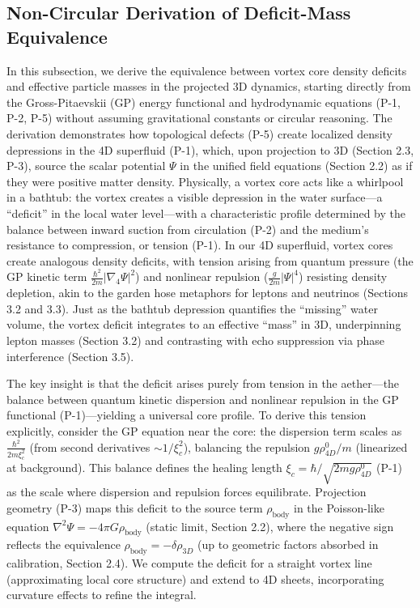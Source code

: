 \subsection{Non-Circular Derivation of Deficit-Mass Equivalence}

In this subsection, we derive the equivalence between vortex core density deficits and effective particle masses in the projected 3D dynamics, starting directly from the Gross-Pitaevskii (GP) energy functional and hydrodynamic equations (P-1, P-2, P-5) without assuming gravitational constants or circular reasoning. The derivation demonstrates how topological defects (P-5) create localized density depressions in the 4D superfluid (P-1), which, upon projection to 3D (Section 2.3, P-3), source the scalar potential $\Psi$ in the unified field equations (Section 2.2) as if they were positive matter density. Physically, a vortex core acts like a whirlpool in a bathtub: the vortex creates a visible depression in the water surface---a ``deficit'' in the local water level---with a characteristic profile determined by the balance between inward suction from circulation (P-2) and the medium's resistance to compression, or tension (P-1). In our 4D superfluid, vortex cores create analogous density deficits, with tension arising from quantum pressure (the GP kinetic term $\frac{\hbar^2}{2m} |\nabla_4 \Psi|^2$) and nonlinear repulsion ($\frac{g}{2m} |\Psi|^4$) resisting density depletion, akin to the garden hose metaphors for leptons and neutrinos (Sections 3.2 and 3.3). Just as the bathtub depression quantifies the ``missing'' water volume, the vortex deficit integrates to an effective ``mass'' in 3D, underpinning lepton masses (Section 3.2) and contrasting with echo suppression via phase interference (Section 3.5).

The key insight is that the deficit arises purely from tension in the aether---the balance between quantum kinetic dispersion and nonlinear repulsion in the GP functional (P-1)---yielding a universal core profile. To derive this tension explicitly, consider the GP equation near the core: the dispersion term scales as $\frac{\hbar^2}{2 m \xi_c^2}$ (from second derivatives $\sim 1/\xi_c^2$), balancing the repulsion $g \rho_{4D}^0 / m$ (linearized at background). This balance defines the healing length $\xi_c = \hbar / \sqrt{2 m g \rho_{4D}^0}$ (P-1) as the scale where dispersion and repulsion forces equilibrate. Projection geometry (P-3) maps this deficit to the source term $\rho_{\text{body}}$ in the Poisson-like equation $\nabla^2 \Psi = -4\pi G \rho_{\text{body}}$ (static limit, Section 2.2), where the negative sign reflects the equivalence $\rho_{\text{body}} = - \delta \rho_{3D}$ (up to geometric factors absorbed in calibration, Section 2.4). We compute the deficit for a straight vortex line (approximating local core structure) and extend to 4D sheets, incorporating curvature effects to refine the integral.

